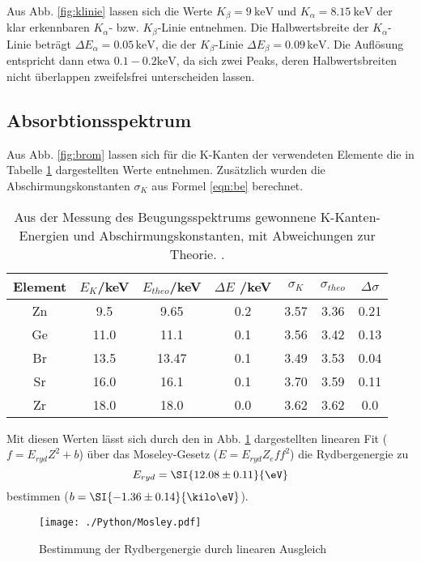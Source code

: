 Aus Abb. \ref{fig:klinie} lassen sich die Werte $K_\beta = \SI{9}{\kilo \eV}$ und $K_\alpha = \SI{8.15}{\kilo \eV}$ der klar erkennbaren $K_\alpha$- bzw. $K_\beta$-Linie entnehmen. Die Halbwertsbreite der $K_\alpha$-Linie beträgt $\Delta E_\alpha = 0.05 \,\si{\kilo \eV}$, die der $K_\beta$-Linie $\Delta E_\beta = 0.09 \, \si{\kilo \eV}$. Die Auflösung entspricht dann etwa $0.1-0.2 \si{\kilo \eV}$, da sich zwei Peaks, deren Halbwertsbreiten nicht überlappen zweifelsfrei unterscheiden lassen.


\subsection{Absorbtionsspektrum}
\label{sec:absorption}
Aus Abb. \ref{fig:brom} lassen sich für die K-Kanten der verwendeten Elemente die in Tabelle \ref{tab:Kkanten} dargestellten Werte entnehmen. Zusätzlich wurden die Abschirmungskonstanten $\sigma_K$ aus Formel \eqref{eqn:be} berechnet.

\begin{table}
  \centering
  \caption{Aus der Messung des Beugungsspektrums gewonnene K-Kanten-Energien und Abschirmungskonstanten, mit Abweichungen zur Theorie. \cite{princeton}.}
  \label{tab:Kkanten}
  \begin{tabular}{|c|c|c|c|c|c|c|}
    \toprule
    Element & $E_K$/keV & $E_{theo}$/keV & $\Delta E$ /keV & $\sigma_K$ & $\sigma_{theo}$ & $\Delta \sigma$ \\
    \midrule
    Zn & 9.5 & 9.65 & 0.2 & 3.57 & 3.36 & 0.21\\
    Ge & 11.0 & 11.1 & 0.1 & 3.56 & 3.42 & 0.13\\
    Br  & 13.5 & 13.47 & 0.1 & 3.49 & 3.53 & 0.04\\
    Sr  & 16.0 & 16.1 & 0.1 & 3.70 & 3.59 & 0.11\\
    Zr  & 18.0 & 18.0 & 0.0 & 3.62 & 3.62 & 0.0 \\
    \bottomrule
    \end{tabular}
\end{table}

Mit diesen Werten lässt sich durch den in Abb. \ref{fig:moseley} dargestellten linearen Fit ($f=E_{ryd} Z^2 +b$) über das Moseley-Gesetz ($E = E_{ryd} Z_eff^2$) die Rydbergenergie zu
\begin{equation*}
  E_{ryd} = \SI{12.08 \pm 0.11}{\eV}
\end{equation*}
bestimmen ($b= \SI{-1.36 \pm 0.14}{\kilo \eV}$).

\begin{figure}
  \centering
  \texttt{[image: ./Python/Mosley.pdf]}
  \caption{Bestimmung der Rydbergenergie durch linearen Ausgleich}
  \label{fig:moseley}
\end{figure}

